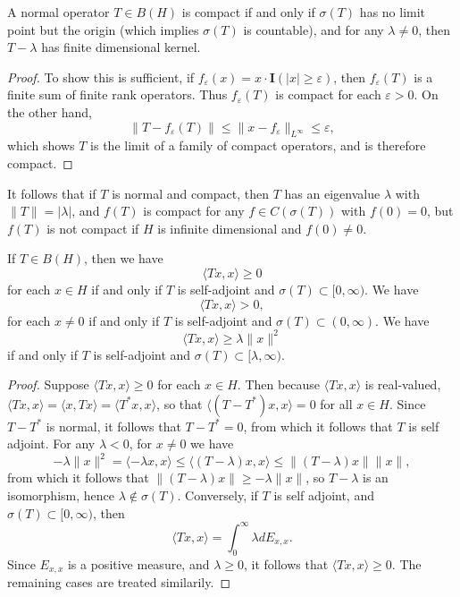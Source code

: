 \begin{theorem}
    A normal operator $T \in B(H)$ is compact if and only if $\sigma(T)$ has no limit point but the origin (which implies $\sigma(T)$ is countable), and for any $\lambda \neq 0$, then $T - \lambda$ has finite dimensional kernel.
\end{theorem}
\begin{proof}
    To show this is sufficient, if $f_\varepsilon(x) = x \cdot \mathbf{I}(|x| \geq \varepsilon)$, then $f_\varepsilon(T)$ is a finite sum of finite rank operators. Thus $f_\varepsilon(T)$ is compact for each $\varepsilon > 0$. On the other hand,
    \[ \| T - f_\varepsilon(T) \| \leq \| x - f_\varepsilon \|_{L^\infty} \leq \varepsilon, \]
    which shows $T$ is the limit of a family of compact operators, and is therefore compact.
\end{proof}

It follows that if $T$ is normal and compact, then $T$ has an eigenvalue $\lambda$ with $\| T \| = |\lambda|$, and $f(T)$ is compact for any $f \in C(\sigma(T))$ with $f(0) = 0$, but $f(T)$ is not compact if $H$ is infinite dimensional and $f(0) \neq 0$.

\begin{theorem}
    If $T \in B(H)$, then we have
    \[ \langle Tx, x \rangle \geq 0 \]
    for each $x \in H$ if and only if $T$ is self-adjoint and $\sigma(T) \subset [0,\infty)$. We have
    \[ \langle Tx, x \rangle > 0, \]
    for each $x \neq 0$ if and only if $T$ is self-adjoint and $\sigma(T) \subset (0,\infty)$. We have
    \[ \langle Tx, x \rangle \geq \lambda \| x \|^2 \]
    if and only if $T$ is self-adjoint and $\sigma(T) \subset [\lambda,\infty)$.
\end{theorem}
\begin{proof}
    Suppose $\langle Tx,x \rangle \geq 0$ for each $x \in H$. Then because $\langle Tx, x \rangle$ is real-valued, $\langle Tx, x \rangle = \langle x, Tx \rangle = \langle T^* x, x \rangle$, so that $\langle (T - T^*) x, x \rangle = 0$ for all $x \in H$. Since $T - T^*$ is normal, it follows that $T - T^* = 0$, from which it follows that $T$ is self adjoint. For any $\lambda < 0$, for $x \neq 0$ we have
    \[ -\lambda \| x \|^2 = \langle -\lambda x, x \rangle \leq \langle (T-\lambda) x, x \rangle \leq \| (T - \lambda) x \| \| x \|, \]
    from which it follows that $\| (T - \lambda) x \| \geq - \lambda \| x \|$, so $T - \lambda$ is an isomorphism, hence $\lambda \not \in \sigma(T)$. Conversely, if $T$ is self adjoint, and $\sigma(T) \subset [0,\infty)$, then
    \[ \langle Tx, x \rangle = \int_0^\infty \lambda dE_{x,x}. \]
    Since $E_{x,x}$ is a positive measure, and $\lambda \geq 0$, it follows that $\langle Tx,x\rangle \geq 0$. The remaining cases are treated similarily.
\end{proof}

